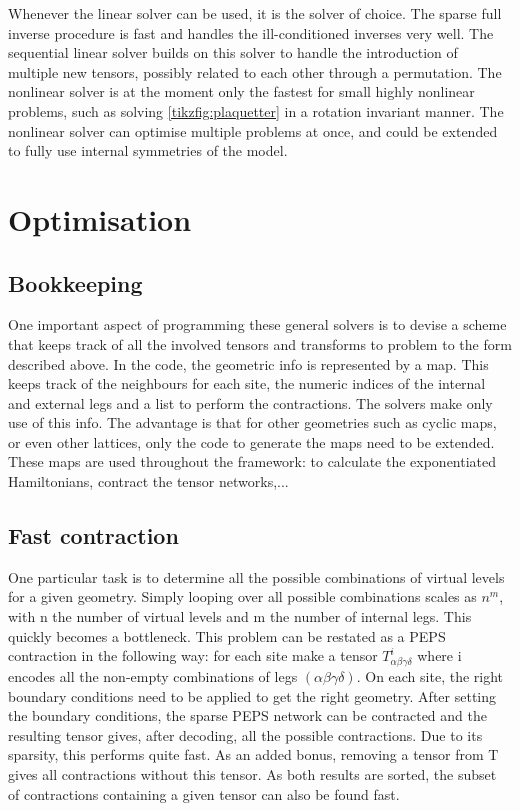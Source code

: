 Whenever the linear solver can be used, it is the solver of choice. The sparse full inverse procedure is fast and handles the ill-conditioned inverses very well. The sequential linear solver builds on this solver to handle the introduction of multiple new tensors, possibly related to each other through a permutation. The nonlinear solver is at the moment only the fastest for small highly nonlinear problems, such as solving \cref{tikzfig:plaquetter} in a rotation invariant manner. The nonlinear solver can optimise multiple problems at once, and could be extended to fully use internal symmetries of the model.

\section{Optimisation}

\subsection{Bookkeeping}

One important aspect of programming these general solvers is to devise a scheme that keeps track of all the involved tensors and transforms to problem to the form described above. In the code, the geometric info is represented by a map. This keeps track of the neighbours for each site, the numeric indices of the internal and external legs and a list to perform the contractions. The solvers make only use of this info. The advantage is that for other geometries such as cyclic maps, or even other lattices, only the code to generate the maps need to be extended. These maps are used throughout the framework: to calculate the exponentiated Hamiltonians, contract the tensor networks,...

\subsection{Fast contraction}

One particular task is to determine all the possible combinations of virtual levels for a given geometry. Simply looping over all possible combinations scales as $n^m$, with n the number of virtual levels and m the number of internal legs. This quickly becomes a bottleneck.
This problem can be restated as a \Gls{PEPS} contraction in the following way: for each site make a tensor $ T^{i}_{  \alpha \beta \gamma \delta } $ where i encodes all the non-empty combinations of legs $(\alpha \beta \gamma \delta)$. On each site, the right boundary conditions need to be applied to get the right geometry. After setting the boundary conditions, the sparse \Gls{PEPS} network can be contracted and the resulting tensor gives, after decoding, all the possible contractions. Due to its sparsity, this performs quite fast.
As an added bonus, removing a tensor from T gives all contractions without this tensor. As both results are sorted, the subset of contractions containing a given tensor can also be found fast.

